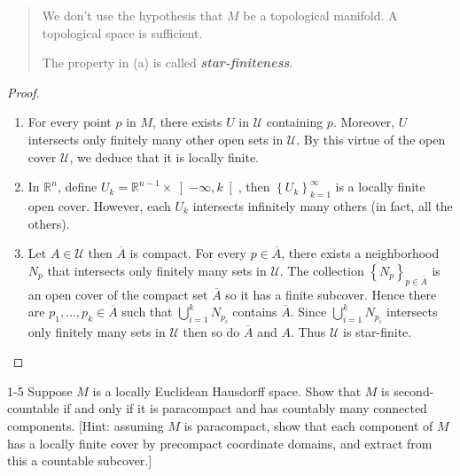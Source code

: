 \begin{quotation}
    We don't use the hypothesis that \( M \) be a topological manifold. A topological space is sufficient.

    The property in (a) is called \textbf{\emph{star-finiteness}}.
\end{quotation}

\begin{proof}
    \begin{enumerate}[itemsep=0pt,label={(\alph*)}]
        \item For every point \( p \) in \( M \), there exists \( U \) in \( \mathcal{U} \) containing \( p \). Moreover, \( U \) intersects only finitely many other open sets in \( \mathcal{U} \). By this virtue of the open cover \( \mathcal{U} \), we deduce that it is locally finite.
        \item In \( \mathbb{R}^{n} \), define \( U_{k} = \mathbb{R}^{n-1} \times \left\rbrack -\infty, k \right\lbrack \), then \( {\left\{U_{k}\right\}}_{k=1}^{\infty} \) is a locally finite open cover. However, each \( U_{k} \) intersects infinitely many others (in fact, all the others).
        \item Let \( A \in \mathcal{U} \) then \( \overline{A} \) is compact. For every \( p \in \overline{A} \), there exists a neighborhood \( N_{p} \) that intersects only finitely many sets in \( \mathcal{U} \). The collection \( {\left\{ N_{p} \right\}}_{p \in \overline{A}} \) is an open cover of the compact set \( \overline{A} \) so it has a finite subcover. Hence there are \( p_{1}, \ldots, p_{k} \in \overline{A} \) such that \( \bigcup_{i=1}^{k} N_{p_{i}} \) contains \( \overline{A} \). Since \( \bigcup_{i=1}^{k} N_{p_{i}} \) intersects only finitely many sets in \( \mathcal{U} \) then so do \( \overline{A} \) and \( A \). Thus \( \mathcal{U} \) is star-finite.
    \end{enumerate}
\end{proof}

\begin{problem}{1-5}
    Suppose \( M \) is a locally Euclidean Hausdorff space. Show that \( M \) is second-countable if and only if it is paracompact and has countably many connected components. [Hint: assuming \( M \) is paracompact, show that each component of \( M \) has a locally finite cover by precompact coordinate domains, and extract from this a countable subcover.]
\end{problem}

